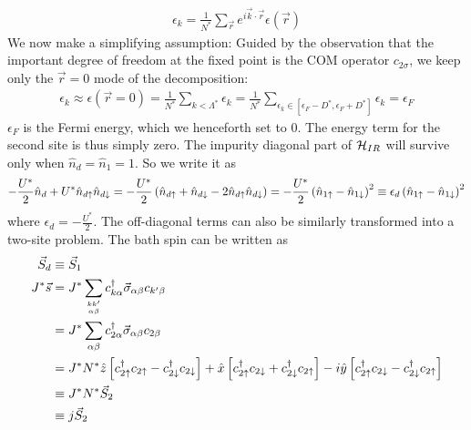 \documentclass[12pt,twoside]{article}
\numberwithin{equation}{section}
\begin{document}
\begin{equation}\begin{aligned}
	\epsilon_k = \frac{1}{N^*}\sum_{\vec r}e^{i \vec{k}\cdot\vec{r}}\epsilon(\vec r)
\end{aligned}\end{equation}
We now make a simplifying assumption: Guided by the observation that the important degree of freedom at the fixed point is the COM operator \(c_{2\sigma}\), we keep only the \(\vec r=0\) mode of the decomposition:
\begin{equation}\begin{aligned}
	\epsilon_k \approx \epsilon(\vec r=0) = \frac{1}{N^*}\sum_{k<\Lambda^*}\epsilon_k = \frac{1}{N^*}\sum_{\epsilon_k \in [\epsilon_F - D^*, \epsilon_F + D^*]}\epsilon_k = \epsilon_F
\end{aligned}\end{equation}
\(\epsilon_F\) is the Fermi energy, which we henceforth set to 0. The energy term for the second site is thus simply zero. The impurity diagonal part of \(\mathcal{H}_{IR}\) will survive only when \(\hat n_d = \hat n_1 = 1\). So we write it as
\begin{equation}\begin{aligned}
	- \frac{U^*}{2}\hat n_d + U^* \hat n_{d\uparrow}\hat n_{d\downarrow} = - \frac{U^*}{2}\left(\hat n_{d\uparrow} + \hat n_{d \downarrow} - 2\hat n_{d\uparrow}\hat n_{d\downarrow}\right) = - \frac{U^*}{2} \left(\hat n_{1 \uparrow} - \hat n_{1 \downarrow}\right)^2 \equiv \epsilon_d \left(\hat n_{1 \uparrow} - \hat n_{1 \downarrow}\right)^2
\end{aligned}\end{equation}
where \(\epsilon_d = - \frac{U^*}{2}\). The off-diagonal terms can also be similarly transformed into a two-site problem. The bath spin can be written as
\begin{equation}\begin{aligned}
	\vec S_d &\equiv \vec S_1\\
	J^*\vec s &= J^* \sum_{kk^\prime\atop{\alpha\beta}}c^\dagger_{k\alpha}\vec \sigma_{\alpha\beta}c_{k^\prime\beta} \\
	       &= J^*\sum_{\alpha\beta}c^\dagger_{2\alpha}\vec \sigma_{\alpha\beta}c_{2\beta} \\
	       &= J^* N^* \hat z\left[c^\dagger_{2 \uparrow}c_{2 \uparrow} - c^\dagger_{2 \downarrow} c_{2 \downarrow} \right] + \hat x \left[c^\dagger_{2 \uparrow}c_{2 \downarrow} + c^\dagger_{2 \downarrow} c_{2 \uparrow} \right] -i \hat y \left[ c^\dagger_{2 \uparrow}c_{2 \downarrow} - c^\dagger_{2 \downarrow} c_{2 \uparrow} \right]\\
	       &\equiv J^*N^* \vec S_2\\
	       &\equiv j \vec S_2\\
\end{aligned}\end{equation}
\end{document}
